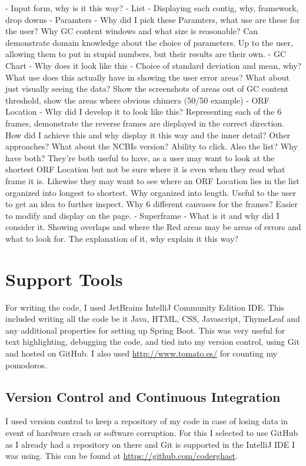 - Input form, why is it this way?
- List - Displaying each contig, why, framework, drop downs
- Paramters - Why did I pick these Paramters, what use are these for the user? Why GC content windows and what size is reasonable? Can demonstrate domain knowledge about the choice of parameters. Up to the user, allowing them to put in stupid numbers, but their results are their own.
- GC Chart - Why does it look like this - Choice of standard deviation and mean, why? What use does this actually have  in showing the user error areas? What about just visually seeing the data? Show the screenshots of areas out of GC content threshold, show the areas where obvious chimera (50/50 example)
- ORF Location - Why did I develop it to look like this? Representing each of the 6 frames, demonstrate the reverse frames are displayed in the correct direction. How did I achieve this and why display it this way and the inner detail? Other approaches? What about the NCBIs version? Ability to click. Also the list? Why have both? They're both useful to have, as a user may want to look at the shortest ORF Location but not be sure where it is even when they read what frame it is. Likewise they may want to see where an ORF Location lies in the list organized into longest to shortest. Why organized into length. Useful to the user to get an idea to further inspect. Why 6 different canvases for the frames? Easier to modify and display on the page.
- Superframe - What is it and why did I consider it. Showing overlaps and where the Red areas may be areas of errors and what to look for. The explanation of it, why explain it this way? 

\section{Support Tools}
For writing the code, I used JetBrains IntelliJ Community Edition IDE. This included writing all the code be it Java, HTML, CSS, Javascript, ThymeLeaf and any additional properties for setting up Spring Boot. This was very useful for text highlighting, debugging the code, and tied into my version control, using Git and hosted on GitHub. I also used \url{http://www.tomato.es/} for counting my pomodoros.

\subsection{Version Control and Continuous Integration}
I used version control to keep a repository of my code in case of losing data in event of hardware crash or software corruption. For this I selected to use GitHub as I already had a repository on there and Git is supported in the IntelliJ IDE I was using. This can be found at \url{https://github.com/coderghast}.


